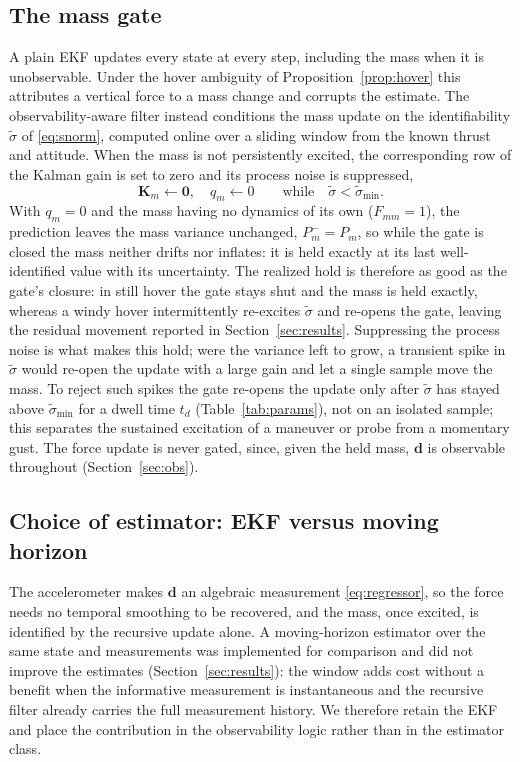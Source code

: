 \documentclass{ieeeaccess}
\newcommand{\vect}[1]{\bm{#1}}
\newcommand{\mat}[1]{\mathbf{#1}}
\begin{document}
\subsection{The mass gate}\label{sec:gate}
A plain EKF updates every state at every step, including the mass when it is
unobservable. Under the hover ambiguity of Proposition~\ref{prop:hover} this
attributes a vertical force to a mass change and corrupts the estimate. The
observability-aware filter instead conditions the mass update on the
identifiability $\tilde\sigma$ of \eqref{eq:snorm}, computed online over a sliding
window from the known thrust and attitude. When the mass is not persistently
excited, the corresponding row of the Kalman gain is set to zero and its process
noise is suppressed,
\begin{equation}
\mat{K}_m\leftarrow\vect{0},\quad q_m\leftarrow 0
\qquad\text{while}\quad \tilde\sigma<\tilde\sigma_{\min}.
\label{eq:gate}
\end{equation}
With $q_m=0$ and the mass having no dynamics of its own ($F_{mm}=1$), the
prediction leaves the mass variance unchanged, $P_m^-=P_m$, so while the gate is
closed the mass neither drifts nor inflates: it is held exactly at its last
well-identified value with its uncertainty. The realized hold is therefore as good
as the gate's closure: in still hover the gate stays shut and the mass is held
exactly, whereas a windy hover intermittently re-excites $\tilde\sigma$ and
re-opens the gate, leaving the residual movement reported in
Section~\ref{sec:results}. Suppressing the process noise is what
makes this hold; were the variance left to grow, a transient spike in
$\tilde\sigma$ would re-open the update with a large gain and let a single sample
move the mass. To reject such spikes the gate re-opens the update only after
$\tilde\sigma$ has stayed above $\tilde\sigma_{\min}$ for a dwell time $t_d$
(Table~\ref{tab:params}), not on an isolated sample; this separates the sustained
excitation of a maneuver or probe from a momentary gust. The force update is
never gated, since, given the held mass, $\vect{d}$ is observable throughout
(Section~\ref{sec:obs}).

\subsection{Choice of estimator: EKF versus moving horizon}\label{sec:nomhe}
The accelerometer makes $\vect{d}$ an algebraic measurement \eqref{eq:regressor},
so the force needs no temporal smoothing to be recovered, and the mass, once
excited, is identified by the recursive update alone. A moving-horizon estimator
over the same state and measurements was implemented for comparison and did not
improve the estimates (Section~\ref{sec:results}): the window adds cost without a
benefit when the informative measurement is instantaneous and the recursive
filter already carries the full measurement history. We therefore retain the EKF
and place the contribution in the observability logic rather than in the
estimator class.
\end{document}
